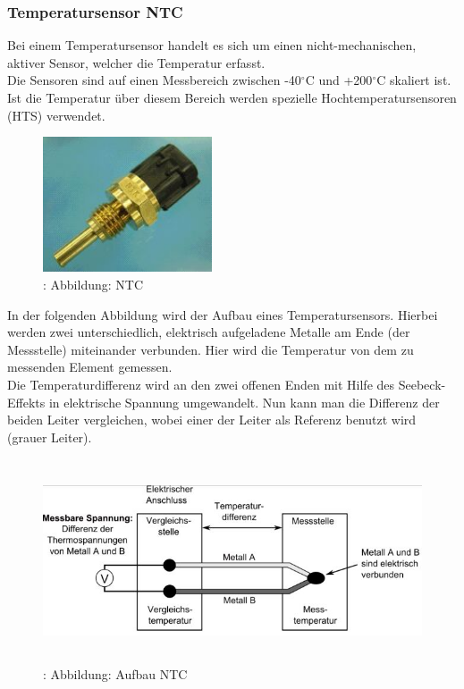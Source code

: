			\subsubsection{Temperatursensor NTC}
				\begin{flushleft}
					Bei einem Temperatursensor handelt 
					es sich um einen 
					nicht-mechanischen, aktiver 
					Sensor, welcher die Temperatur 
					erfasst.\\
					Die Sensoren sind auf einen Messbereich zwischen -40$^\circ$C und +200$^\circ$C skaliert ist. Ist die Temperatur über diesem Bereich werden spezielle Hochtemperatursensoren (HTS) verwendet.
				\end{flushleft}

				\begin{figure}
					\centering
					\includegraphics[width=5cm, height=4cm] {ntc.png}
					\caption{\cite{TS04}: Abbildung: NTC}
				\end{figure}
			
				\begin{flushleft}
						In der folgenden Abbildung wird der Aufbau eines Temperatursensors. Hierbei werden zwei unterschiedlich, elektrisch aufgeladene Metalle am Ende (der Messstelle) miteinander verbunden. Hier wird die Temperatur von dem zu messenden Element gemessen.\\
						Die Temperaturdifferenz wird an den zwei offenen Enden mit Hilfe des Seebeck-Effekts in elektrische Spannung umgewandelt. Nun kann man die Differenz der beiden Leiter vergleichen, wobei einer der Leiter als Referenz benutzt wird (grauer Leiter).\cite{TS05} 
						
				\end{flushleft}
					
				\begin{figure}
					\centering
					\includegraphics[width=12cm, height=6cm] {aufbau_ntc.png}
					\caption{\cite{TS06}: Abbildung: Aufbau NTC}
				\end{figure}
				
